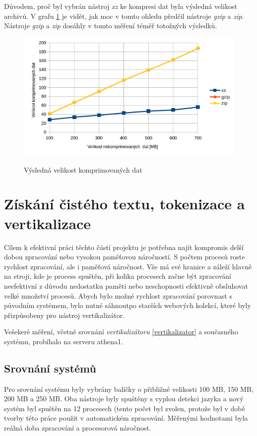 Důvodem, proč byl vybrán nástroj \textit{xz} ke kompresi dat byla výsledná
velikost archivů. V grafu \ref{graph:vysledna_velikost} je vidět,
jak moc v tomto ohledu předčil nástroje \textit{gzip} a \textit{zip}.
Nástroje \textit{gzip} a \textit{zip} dosáhly v tomto měření téměř totožných výsledků.

\begin{figure}[H]
    \begin{center}
        \label{graph:vysledna_velikost}
        \includegraphics[width=1.0\textwidth]{obrazky-figures/graph_vysledna_velikost.png}
        \caption{Výsledná velikost komprimovaných dat}
    \end{center}
\end{figure}

\section{Získání čistého textu, tokenizace a vertikalizace}
Cílem k efektivní práci těchto částí projektu je potřebna najít kompromis
delší dobou zpracování nebo vysokou paměťovou náročností. S
počtem procesů roste rychlost zpracování, ale i paměťová náročnost. Vše má své hranice a
záleží hlavně na stroji, kde je process spuštěn, při kolika procesech začne být
zpracování neefektivní z důvodu nedostatku paměti nebo neschopnosti efektivně obsluhovat velké
množství procesů. Abych bylo možné rychlost zpracování porovnast s původním
systémem, bylo nutné sáhnoutpo starších webových kolekcí, které byly přizpůsobeny pro
nástroj vertikalizátor.

Vešekeré měření, včetně srovnání \textit{vertikalizátoru} \ref{vertikalizator} a současného systému, probíhalo na
serveru athena1.

\subsection{Srovnání systémů}
Pro srovnání systému byly vybrány balíčky o přibližné velikosti 100 MB, 150 MB,
200 MB a 250 MB. Oba nástroje byly spuštěny s vyplou detekci jazyka a nový systém
byl spuštěn na 12 procesech (tento počet byl zvolen, protože byl v době tvorby této
práce použit v automatickém zpracování. Měřenými hodnotami byla reálná doba zpracování
a procesorová náročnost.

